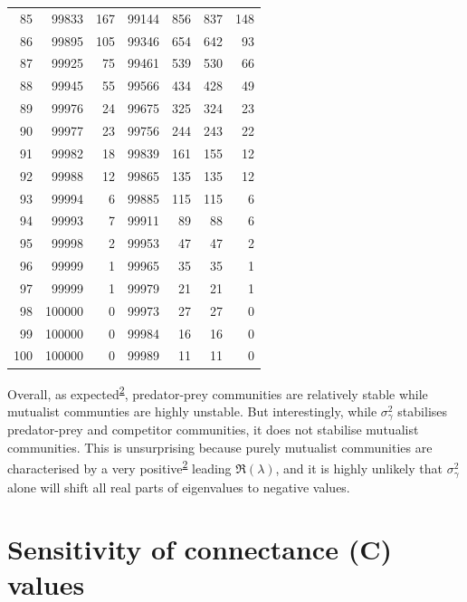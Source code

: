 \documentclass[]{article}
\begin{document}
\begin{longtable}[]{@{}rrrrrrr@{}}
85 & 99833 & 167 & 99144 & 856 & 837 & 148\tabularnewline
86 & 99895 & 105 & 99346 & 654 & 642 & 93\tabularnewline
87 & 99925 & 75 & 99461 & 539 & 530 & 66\tabularnewline
88 & 99945 & 55 & 99566 & 434 & 428 & 49\tabularnewline
89 & 99976 & 24 & 99675 & 325 & 324 & 23\tabularnewline
90 & 99977 & 23 & 99756 & 244 & 243 & 22\tabularnewline
91 & 99982 & 18 & 99839 & 161 & 155 & 12\tabularnewline
92 & 99988 & 12 & 99865 & 135 & 135 & 12\tabularnewline
93 & 99994 & 6 & 99885 & 115 & 115 & 6\tabularnewline
94 & 99993 & 7 & 99911 & 89 & 88 & 6\tabularnewline
95 & 99998 & 2 & 99953 & 47 & 47 & 2\tabularnewline
96 & 99999 & 1 & 99965 & 35 & 35 & 1\tabularnewline
97 & 99999 & 1 & 99979 & 21 & 21 & 1\tabularnewline
98 & 100000 & 0 & 99973 & 27 & 27 & 0\tabularnewline
99 & 100000 & 0 & 99984 & 16 & 16 & 0\tabularnewline
100 & 100000 & 0 & 99989 & 11 & 11 & 0\tabularnewline
\bottomrule
\end{longtable}

Overall, as
expected\textsuperscript{\protect\hyperlink{ref-Allesina2012}{2}},
predator-prey communities are relatively stable while mutualist
communties are highly unstable. But interestingly, while
\(\sigma^{2}_{\gamma}\) stabilises predator-prey and competitor
communities, it does not stabilise mutualist communities. This is
unsurprising because purely mutualist communities are characterised by a
very positive\textsuperscript{\protect\hyperlink{ref-Allesina2012}{2}}
leading \(\Re(\lambda)\), and it is highly unlikely that
\(\sigma^{2}_{\gamma}\) alone will shift all real parts of eigenvalues
to negative values.

\hypertarget{connectance}{\section{Sensitivity of connectance (C)
values}\label{connectance}}
\end{document}
